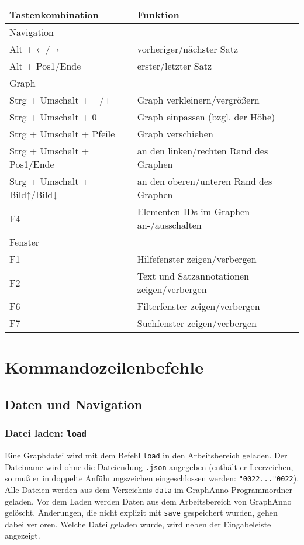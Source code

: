 \documentclass[12pt]{scrartcl}
\newcommand{\quo}{\char"0022}
\begin{document}
\begin{center}
	\begin{tabular*}{\textwidth}{ll}
		\toprule
		Tastenkombination & Funktion \\
		\midrule
		Navigation & \\
		\midrule
			Alt + ←/→ & vorheriger/nächster Satz \\
			Alt + Pos1/Ende & erster/letzter Satz \\
		\midrule
		Graph & \\
		\midrule
			Strg + Umschalt + −/+ & Graph verkleinern/vergrößern \\
			Strg + Umschalt + 0 & Graph einpassen (bzgl. der Höhe) \\
			Strg + Umschalt + Pfeile & Graph verschieben \\
			Strg + Umschalt + Pos1/Ende & an den linken/rechten Rand des Graphen \\
			Strg + Umschalt + Bild↑/Bild↓ & an den oberen/unteren Rand des Graphen \\
			F4 & Elementen-IDs im Graphen an-/ausschalten\\
		\midrule
		Fenster & \\
		\midrule
			F1 & Hilfefenster zeigen/verbergen\\
			F2 & Text und Satzannotationen zeigen/verbergen\\
			F6 & Filterfenster zeigen/verbergen\\
			F7 & Suchfenster zeigen/verbergen\\
		\bottomrule
	\end{tabular*}
\end{center}





\section{Kommandozeilenbefehle}

\subsection{Daten und Navigation}

\subsubsection{Datei laden: \texttt{load}}

Eine Graphdatei wird mit dem Befehl \texttt{load} in den Arbeitsbereich geladen. Der Dateiname wird ohne die Dateiendung \texttt{.json} angegeben (enthält er Leerzeichen, so muß er in doppelte Anführungszeichen eingeschlossen werden: \texttt{\quo...\quo}). Alle Dateien werden aus dem Verzeichnis \texttt{data} im GraphAnno-Programmordner geladen. Vor dem Laden werden Daten aus dem Arbeitsbereich von GraphAnno gelöscht. Änderungen, die nicht explizit mit \texttt{save} gespeichert wurden, gehen dabei verloren.
Welche Datei geladen wurde, wird neben der Eingabeleiste angezeigt.
\end{document}
